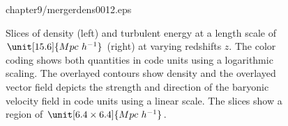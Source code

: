 \begin{figure}[tp]
{{chapter9/mergerdens0012.eps}
\label{fig:dens0012}}
\caption{Slices of density (left) and turbulent energy at a length scale of
$\unit[15.6] {Mpc\ h^{-1}}$ (right) at varying redshifts $z$. The color coding
shows both quantities in code units using a logarithmic scaling. The overlayed
contours show density and the overlayed vector field depicts the strength and
direction of the baryonic velocity field in code units using a linear scale. The
slices show a 
region of $\unit[6.4 \times 6.4] {Mpc\ h^{-1}}$. }
\end{figure}
